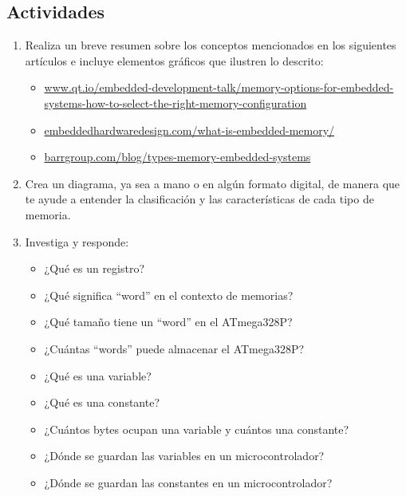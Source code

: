 \documentclass[11pt,letterpaper]{article}
\begin{document}
\subsection*{Actividades}
\begin{enumerate}[label=\arabic*)]
    \item Realiza un breve resumen sobre los conceptos mencionados en los siguientes artículos e incluye elementos gráficos que ilustren lo descrito:
    \begin{itemize}
        \item \href{https://www.qt.io/embedded-development-talk/memory-options-for-embedded-systems-how-to-select-the-right-memory-configuration}{www.qt.io/embedded-development-talk/memory-options-for-embedded-systems-how-to-select-the-right-memory-configuration}
        \item \href{https://embeddedhardwaredesign.com/what-is-embedded-memory/}{embeddedhardwaredesign.com/what-is-embedded-memory/}
        \item \href{https://barrgroup.com/blog/types-memory-embedded-systems}{barrgroup.com/blog/types-memory-embedded-systems}
    \end{itemize}
    \item Crea un diagrama, ya sea a mano o en algún formato digital, de manera que te ayude a entender la clasificación y las características de cada tipo de memoria.
    \item Investiga y responde:
    \begin{itemize}
        \item ¿Qué es un registro? 
        \item ¿Qué significa ``word'' en el contexto de memorias?
        \item ¿Qué tamaño tiene un ``word'' en el ATmega328P?
        \item ¿Cuántas ``words'' puede almacenar el ATmega328P?
        \item ¿Qué es una variable?
        \item ¿Qué es una constante?
        \item ¿Cuántos bytes ocupan una variable y cuántos una constante?
        \item ¿Dónde se guardan las variables en un microcontrolador?
        \item ¿Dónde se guardan las constantes en un microcontrolador?
    \end{itemize}
\end{enumerate}
\end{document}
